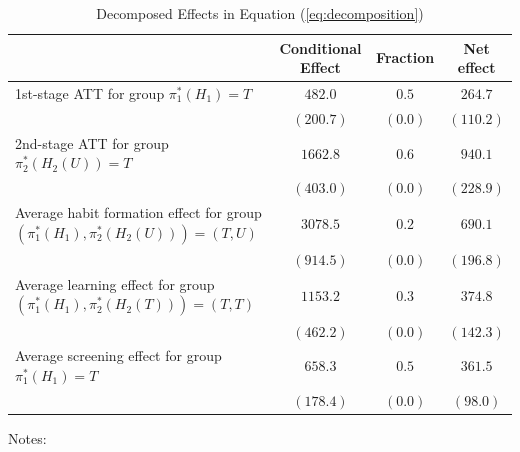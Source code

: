 \vspace{.5cm}
\begin{table}[H]
\caption{Decomposed Effects in Equation (\ref{eq:decomposition})}
\label{tab:comparison_2}
\centering
\begin{threeparttable}
    \begin{tabular}{l ccc}
        \toprule
                &  Conditional Effect & Fraction & Net effect \\
        \midrule
\hline
1st-stage ATT for group $\pi_{1}^{\ast}(H_1) = T$ &$ 482.0$&$0.5$&$264.7$\tabularnewline
&$(200.7)$&$(0.0)$&$(110.2)$\tabularnewline
2nd-stage ATT for group $\pi_{2}^{\ast}(H_2(U))=T$ &$1662.8$&$0.6$&$940.1$\tabularnewline
&$(403.0)$&$(0.0)$&$(228.9)$\tabularnewline
Average habit formation effect for group $(\pi_{1}^{\ast}(H_1),\pi_{2}^{\ast}(H_{2}(U)))=(T,U)$ &$3078.5$&$0.2$&$690.1$\tabularnewline
&$ (914.5)$&$(0.0)$&$(196.8)$\tabularnewline
Average learning effect for group $(\pi_{1}^{\ast}(H_1),\pi_{2}^{\ast}(H_{2}(T)))=(T,T)$ &$1153.2$&$0.3$&$374.8$\tabularnewline
&$(462.2)$&$(0.0)$&$(142.3)$\tabularnewline
Average screening effect for group $\pi_{1}^{\ast}(H_1)=T$& $658.3$&$0.5$&$361.5$\tabularnewline
&$(178.4)$&$(0.0)$&$ (98.0)$\tabularnewline
\hline
    \end{tabular}
\begin{tablenotes}[flushleft]
\footnotesize\item Notes: 
\end{tablenotes}
\end{threeparttable}
\end{table}
\vspace{.5cm}